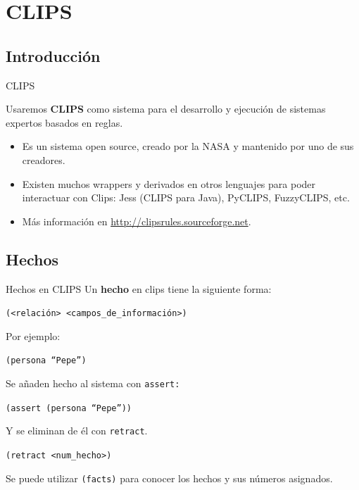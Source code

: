 \documentclass[smaller,spanish,xcolor=svgnames]{beamer}
\begin{document}
\section{CLIPS}

\subsection{Introducción}

\begin{frame}{CLIPS}
  \begin{block}{}
    Usaremos \textbf{CLIPS} como sistema para el desarrollo y ejecución de
    sistemas expertos basados en reglas.
  \end{block}

  \begin{itemize}
  \item Es un sistema open source, creado por la NASA y mantenido por uno de sus
    creadores.
  \item Existen muchos wrappers y derivados en otros lenguajes para poder
    interactuar con Clips: Jess (CLIPS para Java), PyCLIPS, FuzzyCLIPS, etc.
  \item Más información en \url{http://clipsrules.sourceforge.net}.
  \end{itemize}
\end{frame}

\subsection{Hechos}

\begin{frame}{Hechos en CLIPS}
Un \textbf{hecho} en clips tiene la siguiente forma:

\texttt{(<relación> <campos\_de\_información>)}

\bigskip

Por ejemplo:

\texttt{(persona ``Pepe'')}

\bigskip

Se añaden hecho al sistema con \texttt{assert:}

\texttt{(assert (persona ``Pepe''))}

\bigskip

Y se eliminan de él con \texttt{retract}. 

\texttt{(retract <num\_hecho>)}

\medskip

Se puede utilizar \texttt{(facts)} para conocer los hechos y sus números
asignados.
  
\end{frame}
\end{document}
